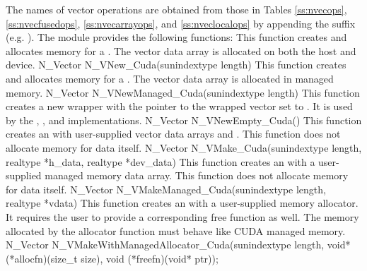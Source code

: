 The names of vector operations are obtained from those in Tables \ref{ss:nvecops},
\ref{ss:nvecfusedops}, \ref{ss:nvecarrayops}, and \ref{ss:nveclocalops}
by appending the suffix 
(e.g. ). The module {\nveccuda} provides the following
functions:
{
  This function creates and allocates memory for a {\cuda} .
  The vector data array is allocated on both the host and device.
}
{
  N\_Vector N\_VNew\_Cuda(sunindextype length)
}
{
  This function creates and allocates memory for a {\cuda} .
  The vector data array is allocated in managed memory.
}
{
  N\_Vector N\_VNewManaged\_Cuda(sunindextype length)
}
{
  This function creates a new {\nvector} wrapper with the pointer to
  the wrapped {\cuda} vector set to . It is used by the
  , , and 
  implementations.
}
{
  N\_Vector N\_VNewEmpty\_Cuda()
}
{
  This function creates an {\nveccuda} with user-supplied vector data arrays
   and . This function does not allocate memory for
  data itself.
}
{
  N\_Vector N\_VMake\_Cuda(sunindextype length, realtype *h\_data, realtype *dev\_data)
}
{
  This function creates an {\nveccuda} with a user-supplied managed memory data
  array. This function does not allocate memory for data itself.
}
{
  N\_Vector N\_VMakeManaged\_Cuda(sunindextype length, realtype *vdata)
}
{
  This function creates an {\nveccuda} with a user-supplied memory allocator.
  It requires the user to provide a corresponding free function as well.
  The memory allocated by the allocator function must behave like CUDA managed memory.
}
{
  N\_Vector N\_VMakeWithManagedAllocator\_Cuda(sunindextype length,
                                               void* (*allocfn)(size\_t size),
                                               void (*freefn)(void* ptr));
}

